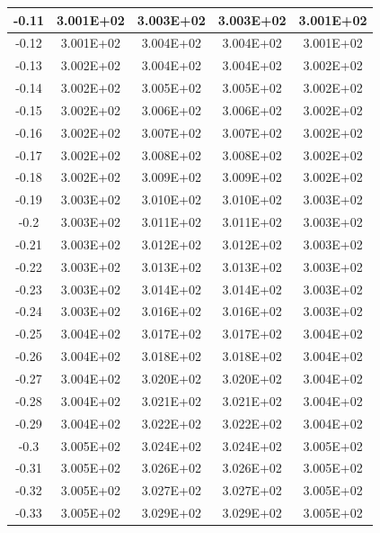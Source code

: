 \documentclass{article}
\begin{document}
\begin{center}
\begin{longtable}{|c|c|c|c|c|}
            -0.11 & 3.001E+02 & 3.003E+02 & 3.003E+02 & 3.001E+02 \\ \hline
            -0.12 & 3.001E+02 & 3.004E+02 & 3.004E+02 & 3.001E+02 \\ \hline
            -0.13 & 3.002E+02 & 3.004E+02 & 3.004E+02 & 3.002E+02 \\ \hline
            -0.14 & 3.002E+02 & 3.005E+02 & 3.005E+02 & 3.002E+02 \\ \hline
            -0.15 & 3.002E+02 & 3.006E+02 & 3.006E+02 & 3.002E+02 \\ \hline
            -0.16 & 3.002E+02 & 3.007E+02 & 3.007E+02 & 3.002E+02 \\ \hline
            -0.17 & 3.002E+02 & 3.008E+02 & 3.008E+02 & 3.002E+02 \\ \hline
            -0.18 & 3.002E+02 & 3.009E+02 & 3.009E+02 & 3.002E+02 \\ \hline
            -0.19 & 3.003E+02 & 3.010E+02 & 3.010E+02 & 3.003E+02 \\ \hline
            -0.2 & 3.003E+02 & 3.011E+02 & 3.011E+02 & 3.003E+02 \\ \hline
            -0.21 & 3.003E+02 & 3.012E+02 & 3.012E+02 & 3.003E+02 \\ \hline
            -0.22 & 3.003E+02 & 3.013E+02 & 3.013E+02 & 3.003E+02 \\ \hline
            -0.23 & 3.003E+02 & 3.014E+02 & 3.014E+02 & 3.003E+02 \\ \hline
            -0.24 & 3.003E+02 & 3.016E+02 & 3.016E+02 & 3.003E+02 \\ \hline
            -0.25 & 3.004E+02 & 3.017E+02 & 3.017E+02 & 3.004E+02 \\ \hline
            -0.26 & 3.004E+02 & 3.018E+02 & 3.018E+02 & 3.004E+02 \\ \hline
            -0.27 & 3.004E+02 & 3.020E+02 & 3.020E+02 & 3.004E+02 \\ \hline
            -0.28 & 3.004E+02 & 3.021E+02 & 3.021E+02 & 3.004E+02 \\ \hline
            -0.29 & 3.004E+02 & 3.022E+02 & 3.022E+02 & 3.004E+02 \\ \hline
            -0.3 & 3.005E+02 & 3.024E+02 & 3.024E+02 & 3.005E+02 \\ \hline
            -0.31 & 3.005E+02 & 3.026E+02 & 3.026E+02 & 3.005E+02 \\ \hline
            -0.32 & 3.005E+02 & 3.027E+02 & 3.027E+02 & 3.005E+02 \\ \hline
            -0.33 & 3.005E+02 & 3.029E+02 & 3.029E+02 & 3.005E+02 \\ \hline

\end{longtable}
\end{center}
\end{document}
